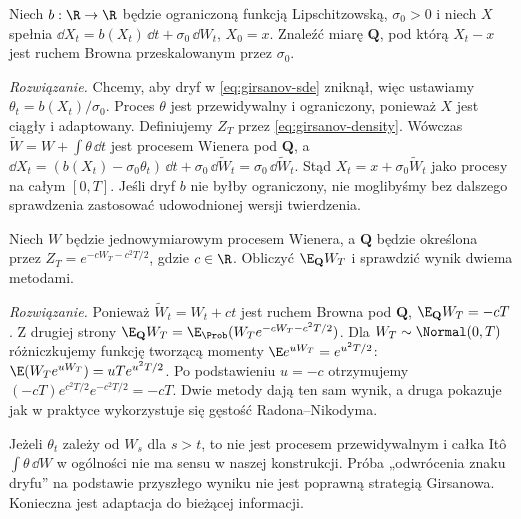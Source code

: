 \begin{zadanie}
Niech $b:\R\to\R$ będzie ograniczoną funkcją Lipschitzowską,
$\sigma_0>0$ i niech $X$ spełnia
$\dd X_t=b(X_t)\,\dd t+\sigma_0\,\dd W_t$, $X_0=x$.
Znaleźć miarę $\mathbf Q$, pod którą $X_t-x$
jest ruchem Browna przeskalowanym przez $\sigma_0$.

\emph{Rozwiązanie.} Chcemy, aby dryf w
\eqref{eq:girsanov-sde} zniknął, więc ustawiamy
$\theta_t=b(X_t)/\sigma_0$.
Proces $\theta$ jest przewidywalny i ograniczony,
ponieważ $X$ jest ciągły i adaptowany. Definiujemy
$Z_T$ przez \eqref{eq:girsanov-density}. Wówczas
$\widetilde W=W+\int\theta\,\dd t$ jest procesem
Wienera pod $\mathbf Q$, a
$\dd X_t=(b(X_t)-\sigma_0\theta_t)\,\dd t
+\sigma_0\,\dd\widetilde W_t=\sigma_0\,\dd\widetilde W_t$.
Stąd $X_t=x+\sigma_0\widetilde W_t$ jako procesy
na całym $[0,T]$. Jeśli dryf $b$ nie byłby ograniczony,
nie moglibyśmy bez dalszego sprawdzenia zastosować
udowodnionej wersji twierdzenia.
\end{zadanie}

\begin{zadanie}
Niech $W$ będzie jednowymiarowym procesem Wienera,
a $\mathbf Q$ będzie określona przez
$Z_T=e^{-cW_T-c^2T/2}$, gdzie $c\in\R$.
Obliczyć $\E_{\mathbf Q}W_T$ i sprawdzić wynik
dwiema metodami.

\emph{Rozwiązanie.} Ponieważ $\widetilde W_t=W_t+ct$
jest ruchem Browna pod $\mathbf Q$,
$\E_{\mathbf Q}W_T=-cT$.
Z drugiej strony
$\E_{\mathbf Q}W_T=\E_{\Prob}(W_Te^{-cW_T-c^2T/2})$.
Dla $W_T\sim\Normal(0,T)$ różniczkujemy funkcję
tworzącą momenty $\E e^{uW_T}=e^{u^2T/2}$:
$\E(W_Te^{uW_T})=uT e^{u^2T/2}$.
Po podstawieniu $u=-c$ otrzymujemy
$(-cT)e^{c^2T/2}e^{-c^2T/2}=-cT$.
Dwie metody dają ten sam wynik, a druga pokazuje
jak w praktyce wykorzystuje się gęstość Radona--Nikodyma.
\end{zadanie}

\begin{przyklad}
Jeżeli $\theta_t$ zależy od $W_s$ dla $s>t$, to nie
jest procesem przewidywalnym i całka Itô
$\int\theta\,\dd W$ w ogólności nie ma sensu w
naszej konstrukcji. Próba „odwrócenia znaku dryfu”
na podstawie przyszłego wyniku nie jest poprawną
strategią Girsanowa. Konieczna jest adaptacja
do bieżącej informacji.
\end{przyklad}

